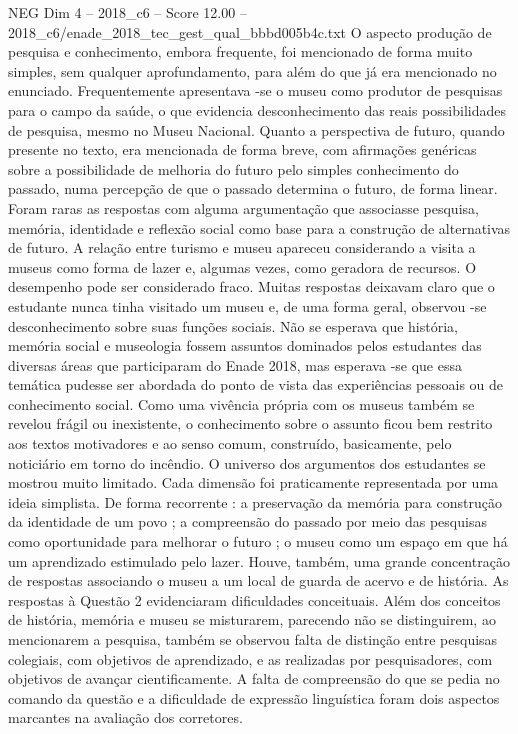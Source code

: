 \begin{textsample}{NEG Dim 4 – 2018\_c6 – Score 12.00 – 2018\_c6/enade\_2018\_tec\_gest\_qual\_bbbd005b4c.txt}
O aspecto produção de pesquisa e conhecimento, embora frequente, foi mencionado de forma muito simples, sem qualquer aprofundamento, para além do que já era mencionado no enunciado.
Frequentemente apresentava -se o museu como produtor de pesquisas para o campo da saúde, o que evidencia desconhecimento das reais possibilidades de pesquisa, mesmo no Museu Nacional.
Quanto a perspectiva de futuro, quando presente no texto, era mencionada de forma breve, com afirmações genéricas sobre a possibilidade de melhoria do futuro pelo simples conhecimento do passado, numa percepção de que o passado determina o futuro, de forma linear.
Foram raras as respostas com alguma argumentação que associasse pesquisa, memória, identidade e reflexão social como base para a construção de alternativas de futuro.
A relação entre turismo e museu apareceu considerando a visita a museus como forma de lazer e, algumas vezes, como geradora de recursos.
O desempenho pode ser considerado fraco.
Muitas respostas deixavam claro que o estudante nunca tinha visitado um museu e, de uma forma geral, observou -se desconhecimento sobre suas funções sociais.
Não se esperava que história, memória social e museologia fossem assuntos dominados pelos estudantes das diversas áreas que participaram do Enade 2018, mas esperava -se que essa temática pudesse ser abordada do ponto de vista das experiências pessoais ou de conhecimento social.
Como uma vivência própria com os museus também se revelou frágil ou inexistente, o conhecimento sobre o assunto ficou bem restrito aos textos motivadores e ao senso comum, construído, basicamente, pelo noticiário em torno do incêndio.
O universo dos argumentos dos estudantes se mostrou muito limitado.
Cada dimensão foi praticamente representada por uma ideia simplista.
De forma recorrente : a preservação da memória para construção da identidade de um povo ; a compreensão do passado por meio das pesquisas como oportunidade para melhorar o futuro ; o museu como um espaço em que há um aprendizado estimulado pelo lazer.
Houve, também, uma grande concentração de respostas associando o museu a um local de guarda de acervo e de história.
As respostas à Questão 2 evidenciaram dificuldades conceituais.
Além dos conceitos de história, memória e museu se misturarem, parecendo não se distinguirem, ao mencionarem a pesquisa, também se observou falta de distinção entre pesquisas colegiais, com objetivos de aprendizado, e as realizadas por pesquisadores, com objetivos de avançar cientificamente.
A falta de compreensão do que se pedia no comando da questão e a dificuldade de expressão linguística foram dois aspectos marcantes na avaliação dos corretores.

\end{textsample}
